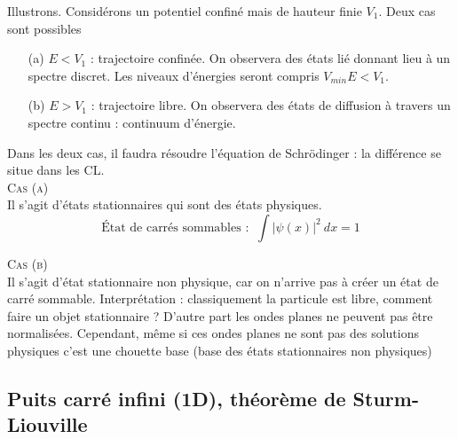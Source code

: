 Illustrons. Considérons un potentiel confiné mais de hauteur finie $V_1$. Deux cas sont possibles
\begin{enumerate}
\item[(a)] $E<V_1$ : trajectoire confinée. On observera des états lié donnant lieu à un spectre discret. 
Les niveaux d'énergies seront compris $V_{min}E<V_1$.
\item[(b)] $E>V_1$ : trajectoire libre. On observera des états de diffusion à travers un spectre continu :
continuum d'énergie.
\end{enumerate}
Dans les deux cas, il faudra résoudre l'équation de Schrödinger : la différence se situe dans les CL. \\

\textsc{Cas (a)}\\
Il s'agit d'états stationnaires qui sont des états physiques.
\begin{equation}
\text{État de carrés sommables : }\ \int |\psi(x)|^2\ dx = 1
\end{equation}

\textsc{Cas (b)}\\
Il s'agit d'état stationnaire non physique, car on n'arrive pas à créer un état de 
carré sommable. Interprétation : classiquement la particule est libre, comment 
faire un objet stationnaire ? D'autre part les ondes planes ne peuvent pas 
être normalisées. Cependant, même si ces ondes planes ne sont pas des solutions physiques 
c'est une chouette base (base des états stationnaires non physiques)\\

\subsection{Puits carré infini (1D), théorème de Sturm-Liouville}
